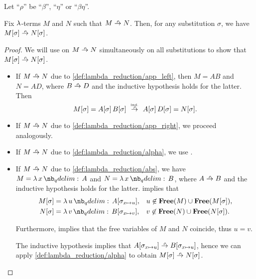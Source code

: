 \begin{proposition}\label{thm:substitution_on_beta_eta_reduction}
  Let \enquote{\( \rho \)} be \enquote{\( \beta \)}, \enquote{\( \eta \)} or \enquote{\( \beta\eta \)}.

  Fix \( \mathrm{\lambda} \)-terms \( M \) and \( N \) such that \( M \rred N \). Then, for any substitution \( \sigma \), we have \( M[\sigma] \rred N[\sigma] \).
\end{proposition}
\begin{proof}
  We will use  on \( M \rred N \) simultaneously on all substitutions to show that \( M[\sigma] \rred N[\sigma] \).
  \begin{itemize}
    \item If \( M \rred N \) due to \ref{def:lambda_reduction/app_left}, then \( M = AB \) and \( N = AD \), where \( B \rred D \) and the inductive hypothesis holds for the latter. Then
    \begin{equation*}
      M[\sigma]
      =
      A[\sigma] \thinspace B[\sigma]
      \reloset {\T{ind.}} \rred
      A[\sigma] \thinspace D[\sigma]
      =
      N[\sigma].
    \end{equation*}

    \item If \( M \rred N \) due to \ref{def:lambda_reduction/app_right}, we proceed analogously.

    \item If \( M \rred N \) due to \ref{def:lambda_reduction/alpha}, we use .

    \item If \( M \rred N \) due to \ref{def:lambda_reduction/abs}, we have \( M = \qabs x A \) and \( N = \qabs x B \), where \( A \rred B \) and the inductive hypothesis holds for the latter.  implies that
    \begin{align*}
      M[\sigma] &= \qabs u A[\sigma_{x \mapsto u}], &&u \not\in \op*{Free}(M) \cup \op*{Free}(M[\sigma]), \\
      N[\sigma] &= \qabs v B[\sigma_{x \mapsto v}], &&v \not\in \op*{Free}(N) \cup \op*{Free}(N[\sigma]).
    \end{align*}

    Furthermore,  implies that the free variables of \( M \) and \( N \) coincide, thus \( u = v \).

    The inductive hypothesis implies that \( A[\sigma_{x \mapsto u}] \rred B[\sigma_{x \mapsto u}] \), hence we can apply \ref{def:lambda_reduction/alpha} to obtain \( M[\sigma] \rred N[\sigma] \).
  \end{itemize}
\end{proof}

